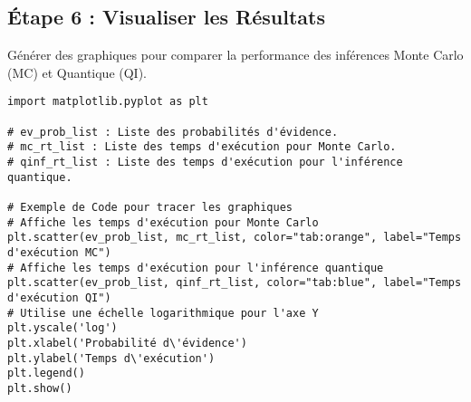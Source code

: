 
\subsection*{Étape 6 : Visualiser les Résultats}
Générer des graphiques pour comparer la performance des inférences Monte Carlo (MC) et Quantique (QI).
\begin{verbatim}
import matplotlib.pyplot as plt

# ev_prob_list : Liste des probabilités d'évidence.
# mc_rt_list : Liste des temps d'exécution pour Monte Carlo.
# qinf_rt_list : Liste des temps d'exécution pour l'inférence quantique.

# Exemple de Code pour tracer les graphiques
# Affiche les temps d'exécution pour Monte Carlo
plt.scatter(ev_prob_list, mc_rt_list, color="tab:orange", label="Temps d'exécution MC") 
# Affiche les temps d'exécution pour l'inférence quantique
plt.scatter(ev_prob_list, qinf_rt_list, color="tab:blue", label="Temps d'exécution QI") 
# Utilise une échelle logarithmique pour l'axe Y
plt.yscale('log')  
plt.xlabel('Probabilité d\'évidence')  
plt.ylabel('Temps d\'exécution')  
plt.legend()  
plt.show() 
\end{verbatim}







\iffalse
\begin{lstlisting}
import pyAgrum as gum
import pyAgrum.lib.quantik as gqt

# From BN to QC
bn=gum.fastBN('A->B{yes|no}->C',5)

#for v in bn.names():
#  print(bn[v])
#  print(bn[v].domainSize())
#  print(bn.cpt(v))

qbn=qgt.qBN(bn)
print(qbn.qbytes())
circuit=qbn.toqiskit()

qie = qgt.qRejectSampling(bn)
qie.addEvidence("C",3)
qie.setEpsilon(1e-5)
qie.setTimeout(5)
cinference=qie.toqiskit() 
\end{lstlisting}
\fi
